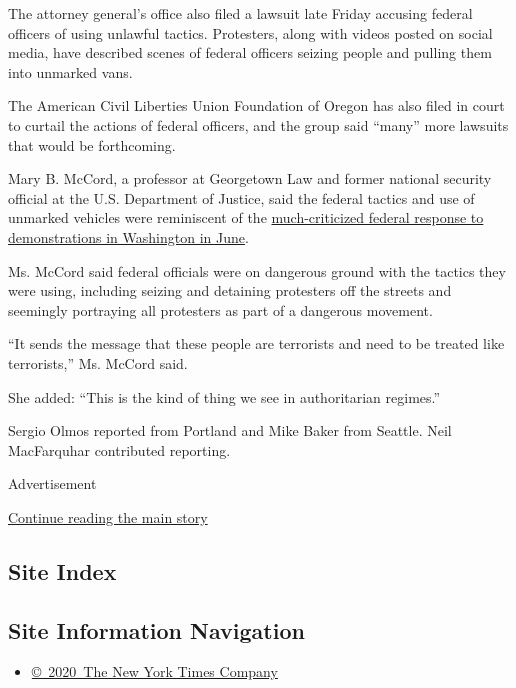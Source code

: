 The attorney general's office also filed a lawsuit late Friday accusing
federal officers of using unlawful tactics. Protesters, along with
videos posted on social media, have described scenes of federal officers
seizing people and pulling them into unmarked vans.

The American Civil Liberties Union Foundation of Oregon has also filed
in court to curtail the actions of federal officers, and the group said
``many'' more lawsuits that would be forthcoming.

Mary B. McCord, a professor at Georgetown Law and former national
security official at the U.S. Department of Justice, said the federal
tactics and use of unmarked vehicles were reminiscent of the
\href{https://www.nytimes.com/2020/06/02/us/politics/trump-walk-lafayette-square.html}{much-criticized
federal response to demonstrations in Washington in June}.

Ms. McCord said federal officials were on dangerous ground with the
tactics they were using, including seizing and detaining protesters off
the streets and seemingly portraying all protesters as part of a
dangerous movement.

``It sends the message that these people are terrorists and need to be
treated like terrorists,'' Ms. McCord said.

She added: ``This is the kind of thing we see in authoritarian
regimes.''

Sergio Olmos reported from Portland and Mike Baker from Seattle. Neil
MacFarquhar contributed reporting.

Advertisement

\protect\hyperlink{after-bottom}{Continue reading the main story}

\hypertarget{site-index}{%
\subsection{Site Index}\label{site-index}}

\hypertarget{site-information-navigation}{%
\subsection{Site Information
Navigation}\label{site-information-navigation}}

\begin{itemize}
\tightlist
\item
  \href{https://help.nytimes.com/hc/en-us/articles/115014792127-Copyright-notice}{©~2020~The
  New York Times Company}
\end{itemize}

